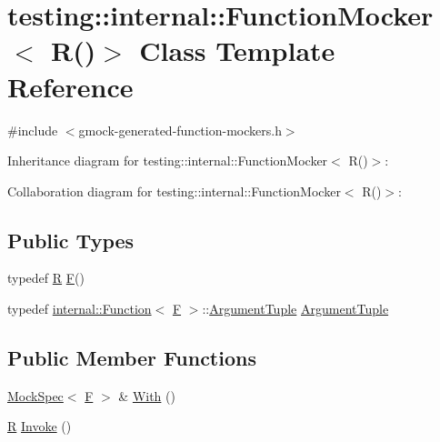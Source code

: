 \hypertarget{classtesting_1_1internal_1_1_function_mocker_3_01_r_07_08_4}{}\section{testing\+:\+:internal\+:\+:Function\+Mocker$<$ R()$>$ Class Template Reference}
\label{classtesting_1_1internal_1_1_function_mocker_3_01_r_07_08_4}


{\ttfamily \#include $<$gmock-\/generated-\/function-\/mockers.\+h$>$}



Inheritance diagram for testing\+:\+:internal\+:\+:Function\+Mocker$<$ R()$>$\+:


Collaboration diagram for testing\+:\+:internal\+:\+:Function\+Mocker$<$ R()$>$\+:
\subsection*{Public Types}
\begin{DoxyCompactItemize}
\item 
typedef \hyperlink{typedefs__9_8js_afb423b73ee7b6c04d2d54fc06e405404}{R} \hyperlink{classtesting_1_1internal_1_1_function_mocker_3_01_r_07_08_4_a2c1d7da413176d87405227df90a95521}{F}()
\item 
typedef \hyperlink{structtesting_1_1internal_1_1_function}{internal\+::\+Function}$<$ \hyperlink{classtesting_1_1internal_1_1_function_mocker_3_01_r_07_08_4_a2c1d7da413176d87405227df90a95521}{F} $>$\+::\hyperlink{classtesting_1_1internal_1_1_function_mocker_3_01_r_07_08_4_a5a279e0d8414bf0809405c06a0725b66}{Argument\+Tuple} \hyperlink{classtesting_1_1internal_1_1_function_mocker_3_01_r_07_08_4_a5a279e0d8414bf0809405c06a0725b66}{Argument\+Tuple}
\end{DoxyCompactItemize}
\subsection*{Public Member Functions}
\begin{DoxyCompactItemize}
\item 
\hyperlink{classtesting_1_1internal_1_1_mock_spec}{Mock\+Spec}$<$ \hyperlink{classtesting_1_1internal_1_1_function_mocker_3_01_r_07_08_4_a2c1d7da413176d87405227df90a95521}{F} $>$ \& \hyperlink{classtesting_1_1internal_1_1_function_mocker_3_01_r_07_08_4_af5151d1ae246fab13ac6e890fa2599be}{With} ()
\item 
\hyperlink{typedefs__9_8js_afb423b73ee7b6c04d2d54fc06e405404}{R} \hyperlink{classtesting_1_1internal_1_1_function_mocker_3_01_r_07_08_4_a8096a10aea2ffc6a78d0437855d2ef10}{Invoke} ()
\end{DoxyCompactItemize}
